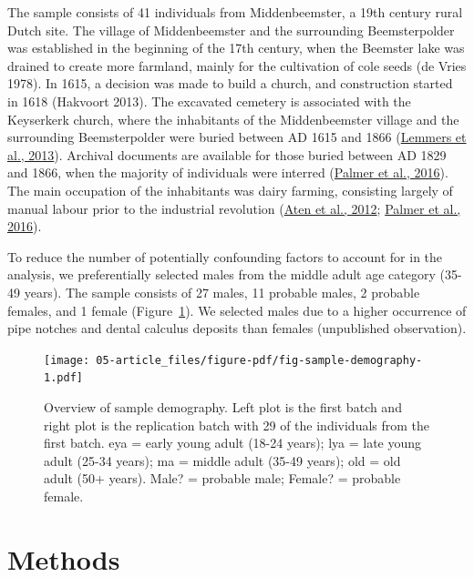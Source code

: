 \documentclass[
  b5paper,
]{book}
\begin{document}
The sample consists of 41 individuals from Middenbeemster, a 19th
century rural Dutch site. The village of Middenbeemster and the
surrounding Beemsterpolder was established in the beginning of the 17th
century, when the Beemster lake was drained to create more farmland,
mainly for the cultivation of cole seeds (de Vries 1978). In 1615, a
decision was made to build a church, and construction started in 1618
(Hakvoort 2013). The excavated cemetery is associated with the
Keyserkerk church, where the inhabitants of the Middenbeemster village
and the surrounding Beemsterpolder were buried between AD 1615 and 1866
(\protect\hyperlink{ref-lemmersMiddenbeemster2013}{Lemmers et al.,
2013}). Archival documents are available for those buried between AD
1829 and 1866, when the majority of individuals were interred
(\protect\hyperlink{ref-palmerActivityReconstruction2016}{Palmer et al.,
2016}). The main occupation of the inhabitants was dairy farming,
consisting largely of manual labour prior to the industrial revolution
(\protect\hyperlink{ref-aten400Jaar2012}{Aten et al., 2012};
\protect\hyperlink{ref-palmerActivityReconstruction2016}{Palmer et al.,
2016}).

To reduce the number of potentially confounding factors to account for
in the analysis, we preferentially selected males from the middle adult
age category (35-49 years). The sample consists of 27 males, 11 probable
males, 2 probable females, and 1 female
(Figure~\ref{fig-sample-demography}). We selected males due to a higher
occurrence of pipe notches and dental calculus deposits than females
(unpublished observation).

\begin{figure}

{\centering \texttt{[image: 05-article\_files/figure-pdf/fig-sample-demography-1.pdf]}

}

\caption{\label{fig-sample-demography}Overview of sample demography.
Left plot is the first batch and right plot is the replication batch
with 29 of the individuals from the first batch. eya = early young adult
(18-24 years); lya = late young adult (25-34 years); ma = middle adult
(35-49 years); old = old adult (50+ years). Male? = probable male;
Female? = probable female.}

\end{figure}

\hypertarget{methods}{%
\section{Methods}\label{methods}}
\end{document}
